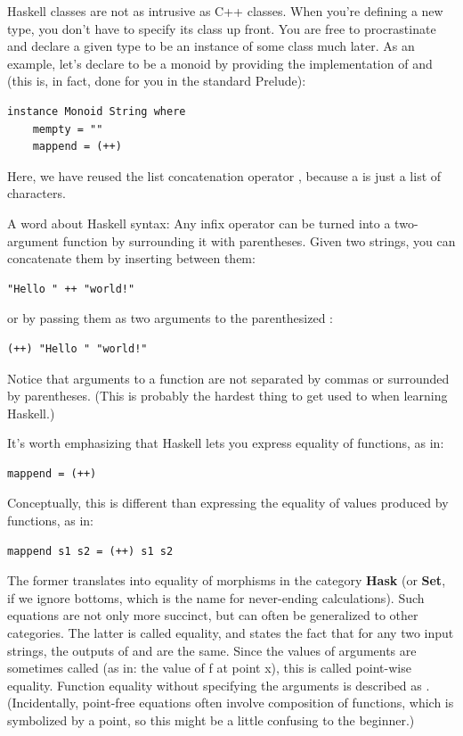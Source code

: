 Haskell classes are not as intrusive as C++ classes. When you're
defining a new type, you don't have to specify its class up front. You
are free to procrastinate and declare a given type to be an instance of
some class much later. As an example, let's declare  to
be a monoid by providing the implementation of  and
 (this is, in fact, done for you in the standard
Prelude):

\begin{verbatim}
instance Monoid String where
    mempty = ""
    mappend = (++)
\end{verbatim}
Here, we have reused the list concatenation operator \code{(++)},
because a  is just a list of characters.

A word about Haskell syntax: Any infix operator can be turned into a
two-argument function by surrounding it with parentheses. Given two
strings, you can concatenate them by inserting \code{++} between them:

\begin{verbatim}
"Hello " ++ "world!"
\end{verbatim}
or by passing them as two arguments to the parenthesized \code{(++)}:

\begin{verbatim}
(++) "Hello " "world!"
\end{verbatim}
Notice that arguments to a function are not separated by commas or
surrounded by parentheses. (This is probably the hardest thing to get
used to when learning Haskell.)

It's worth emphasizing that Haskell lets you express equality of
functions, as in:

\begin{verbatim}
mappend = (++)
\end{verbatim}
Conceptually, this is different than expressing the equality of values
produced by functions, as in:

\begin{verbatim}
mappend s1 s2 = (++) s1 s2
\end{verbatim}
The former translates into equality of morphisms in the category
\textbf{Hask} (or \textbf{Set}, if we ignore bottoms, which is the name
for never-ending calculations). Such equations are not only more
succinct, but can often be generalized to other categories. The latter
is called  equality, and states the fact that for any
two input strings, the outputs of  and \code{(++)} are
the same. Since the values of arguments are sometimes called
 (as in: the value of f at point x), this is called
point-wise equality. Function equality without specifying the arguments
is described as . (Incidentally, point-free equations
often involve composition of functions, which is symbolized by a point,
so this might be a little confusing to the beginner.)

